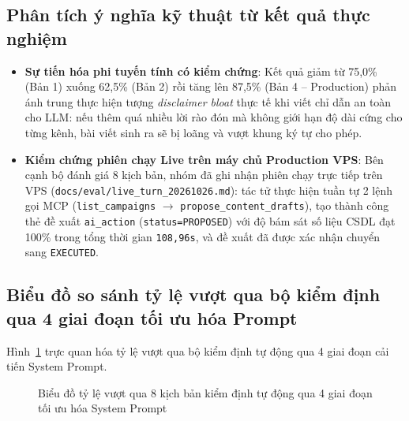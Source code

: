 \subsection{Phân tích ý nghĩa kỹ thuật từ kết quả thực nghiệm}
\begin{itemize}[noitemsep,topsep=2pt]
 \item \textbf{Sự tiến hóa phi tuyến tính có kiểm chứng}: Kết quả giảm từ 75,0\% (Bản 1) xuống 62,5\% (Bản 2) rồi tăng lên 87,5\% (Bản 4 -- Production) phản ánh trung thực hiện tượng \textit{disclaimer bloat} thực tế khi viết chỉ dẫn an toàn cho LLM: nếu thêm quá nhiều lời rào đón mà không giới hạn độ dài cứng cho từng kênh, bài viết sinh ra sẽ bị loãng và vượt khung ký tự cho phép.
 \item \textbf{Kiểm chứng phiên chạy Live trên máy chủ Production VPS}: Bên cạnh bộ đánh giá 8 kịch bản, nhóm đã ghi nhận phiên chạy trực tiếp trên VPS (\texttt{docs/eval/live\_turn\_20261026.md}): tác tử thực hiện tuần tự 2 lệnh gọi MCP (\texttt{list\_campaigns} $\rightarrow$ \texttt{propose\_content\_drafts}), tạo thành công thẻ đề xuất \texttt{ai\_action} (\texttt{status=PROPOSED}) với độ bám sát số liệu CSDL đạt 100\% trong tổng thời gian \texttt{108,96s}, và đề xuất đã được xác nhận chuyển sang \texttt{EXECUTED}.
\end{itemize}

\subsection{Biểu đồ so sánh tỷ lệ vượt qua bộ kiểm định qua 4 giai đoạn tối ưu hóa Prompt}
Hình~\ref{fig:latency-chart} trực quan hóa tỷ lệ vượt qua bộ kiểm định tự động qua 4 giai đoạn cải tiến System Prompt.

\begin{figure}[!htbp]
\centering
{}
\caption{Biểu đồ tỷ lệ vượt qua 8 kịch bản kiểm định tự động qua 4 giai đoạn tối ưu hóa System Prompt}
\label{fig:latency-chart}
\end{figure}

